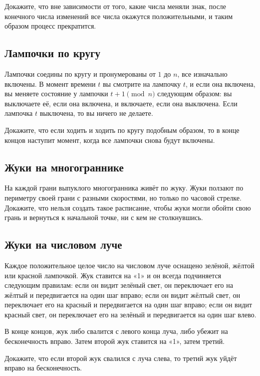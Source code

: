Докажите, что вне зависимости от того, какие числа меняли знак, после конечного числа изменений все числа окажутся положительными, и таким образом процесс прекратится.

\subsection*{Лампочки по кругу}%

Лампочки соедины по кругу и пронумерованы от $1$ до $n$, все изначально включены.
В момент времени $t$ вы смотрите на лампочку $t$, и если она включена, вы меняете состояние у лампочки $t + 1 \pmod{n}$ следующим образом: вы выключаете её, если она включена, и включаете, если она выключена.
Если лампочка $t$ выключена, то вы ничего не делаете.

Докажите, что если ходить и ходить по кругу подобным образом, то в конце концов наступит момент, когда все лампочки снова будут включены.

\subsection*{Жуки на многограннике}%

На каждой грани выпуклого многогранника живёт по жуку.
Жуки ползают по периметру своей грани с разными скоростями, но только по часовой стрелке.
Докажите, что нельзя создать такое расписание, чтобы жуки могли обойти свою грань и вернуться к начальной точке, ни с кем не столкнувшись.

\subsection*{Жуки на числовом луче}%

Каждое положительное целое число на числовом луче оснащено зелёной, жёлтой или красной лампочкой.
Жук ставится на «1» и он всегда подчиняется следующим правилам: если он видит зелёный свет, он переключает его на жёлтый и передвигается на один шаг вправо; 
если он видит жёлтый свет, он переключает его на красный и передвигается на один шаг вправо; 
если он видит красный свет, он переключает его на зелёный и передвигается на один шаг влево.

В конце концов, жук либо свалится с левого конца луча, либо убежит на бесконечность вправо.
Затем второй жук ставится на «1», затем третий.

Докажите, что если второй жук свалился с луча слева, то третий жук уйдёт вправо на бесконечность.

